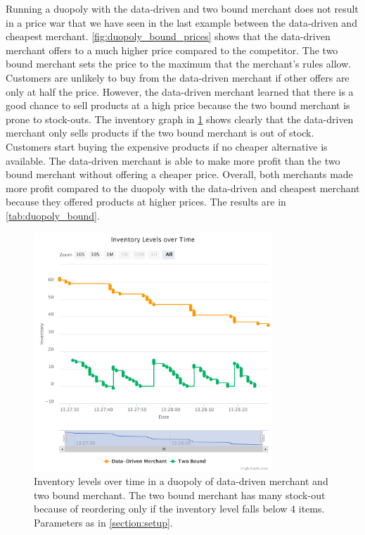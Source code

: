 Running a duopoly with the data-driven and two bound merchant does not result in a price war that we have seen in the last example between the data-driven and cheapest merchant.
\cref{fig:duopoly_bound_prices} shows that the data-driven merchant offers to a much higher price compared to the competitor.
The two bound merchant sets the price to the maximum that the merchant's rules allow.
Customers are unlikely to buy from the data-driven merchant if other offers are only at half the price.
However, the data-driven merchant learned that there is a good chance to sell products at a high price because the two bound merchant is prone to stock-outs.
The inventory graph in \cref{fig:duopoly_bound_inventory} shows clearly that the data-driven merchant only sells products if the two bound merchant is out of stock.
Customers start buying the expensive products if no cheaper alternative is available.
The data-driven merchant is able to make more profit than the two bound merchant without offering a cheaper price.
Overall, both merchants made more profit compared to the duopoly with the data-driven and cheapest merchant because they offered products at higher prices.
The results are in \cref{tab:duopoly_bound}.

\begin{figure}[t]
	\centering
	\includegraphics[width=0.8\textwidth]{figures/duopoly_bound_inventory}
	\caption[Inventory Levels: Data-Driven Merchant versus Two Bound Merchant]{Inventory levels over time in a duopoly of data-driven merchant and two bound merchant. The two bound merchant has many stock-out because of reordering only if the inventory level falls below 4 items. Parameters as in \cref{section:setup}.}
	\label{fig:duopoly_bound_inventory}
\end{figure}


